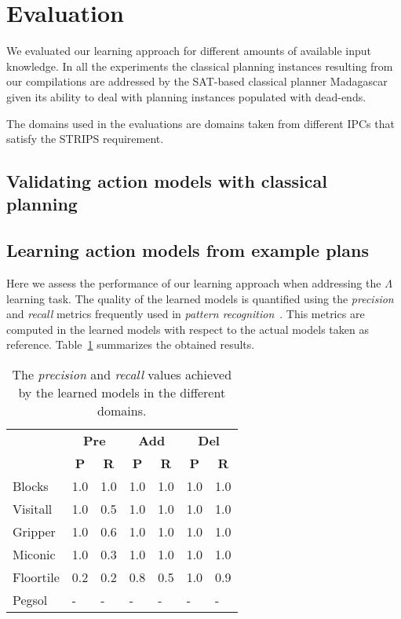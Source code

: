 \documentclass[letterpaper]{article} %
\begin{document}
\section{Evaluation}
We evaluated our learning approach for different amounts of available input knowledge. In all the experiments the classical planning instances resulting from our compilations are addressed by the SAT-based classical planner {\sc Madagascar}~\cite{rintanen2014madagascar} given its ability to deal with planning instances populated with dead-ends.

The domains used in the evaluations are domains taken from different IPCs that satisfy the STRIPS requirement. 


\subsection{Validating action models with classical planning}


\subsection{Learning action models from example plans}
Here we assess the performance of our learning approach when addressing the $\Lambda$ learning task. The quality of the learned models is quantified using the {\em precision} and {\em recall} metrics frequently used in {\em pattern recognition}~\cite{davis2006relationship}. This metrics are computed in the learned models with respect to the actual models taken as reference. Table~\ref{tab:results_plans} summarizes the obtained results.

\begin{table}[hbt!]
	\begin{center}
		\begin{tabular}{l|l|l|l|l|l|l|}
			 & \multicolumn{2}{|c|}{\bf Pre} & \multicolumn{2}{|c|}{\bf Add} & \multicolumn{2}{|c|}{\bf Del}  \\ \cline{2-7}			 
			  & \multicolumn{1}{|c|}{\bf P} & \multicolumn{1}{|c|}{\bf R} & \multicolumn{1}{|c|}{\bf P} & \multicolumn{1}{|c|}{\bf R} & \multicolumn{1}{|c|}{\bf P} & \multicolumn{1}{|c|}{\bf R} \\
			\hline
			Blocks & 1.0 & 1.0 & 1.0 & 1.0 & 1.0 & 1.0 \\
			Visitall & 1.0 & 0.5 & 1.0 & 1.0 & 1.0 & 1.0 \\
			Gripper & 1.0 & 0.6 & 1.0 & 1.0 & 1.0 & 1.0 \\
			Miconic & 1.0 & 0.3 & 1.0 & 1.0 & 1.0 & 1.0 \\
			Floortile & 0.2 & 0.2 & 0.8 & 0.5 & 1.0 & 0.9 \\
			Pegsol & - & - & - & - & - & - \\
		\end{tabular}
	\end{center}	        
\caption{The {\em precision} and {\em recall} values achieved by the learned models in the different domains.}
\label{tab:results_plans}
\end{table}
\end{document}
